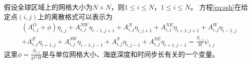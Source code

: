 假设全球区域上的网格大小为$N\times N$，则$1\le i\le N$，$1\le i\le N$。  
方程\ref{eq:ssh}在给定点$(i,j)$上的离散格式可以表示为  
\begin{align}
\label{eq:sten}
&(A_{i,j}^O+\phi ) \eta_{i,j}+A_{i,j}^{NW}\eta_{i-1,j+1}+A_{i,j}^N\eta_{i,j+1} +A_{i,j}^{NE}\eta_{i+1,j+1}+A_{i,j}^W\eta_{i-1,j}  \nonumber\\
& +A_{i,j}^E\eta_{i+1,j} +A_{i,j}^{SW}\eta_{i-1,j-1} +A_{i,j}^S\eta_{i,j-1}+ A_{i,j }^{SE}\eta_{i+1,j-1}= \frac{S_{i,j}}{H}\psi_{i,j}
\end{align}
这里$\phi = \frac{S_{i,j}}{g \tau^2H}$是与单位网格大小、海底深度和时间步长有关的一个变量。

